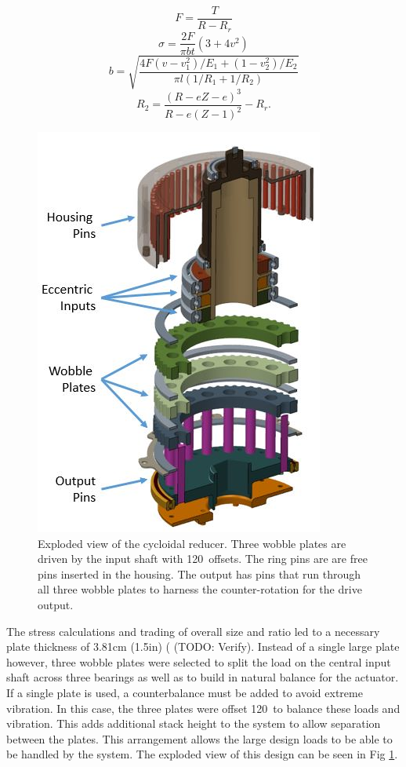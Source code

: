 \begin{equation} \label{eq:5}
F = \frac{T}{R - R_r}
\end{equation}
\begin{equation} \label{eq:6}
\sigma = \frac{2F}{\pi b t} (3 + 4v^2)
\end{equation}
\begin{equation} \label{eq:7}
b = \sqrt{\frac{4F (v-v_1^2) /E_1 + (1 - v_2^2)/E_2}{\pi l (1/R_1 + 1/R_2)}}
\end{equation}
\begin{equation} \label{eq:8}
R_2 = \frac{(R-eZ - e)^3}{R-e(Z-1)^2} - R_r.
\end{equation}

\begin{figure}[!b]
   \centering
   \includegraphics[width=0.75\linewidth]{images/exploded_labeled}
   \caption{Exploded view of the cycloidal reducer.
   Three wobble plates are driven by the input shaft with 120\textdegree\ offsets.
   The ring pins are are free pins inserted in the housing.
   The output has pins that run through all three wobble plates to harness the counter-rotation for the drive output.}
   \label{cycloid_exploded}
\end{figure}

The stress calculations and trading of overall size and ratio led to a necessary plate thickness of 3.81cm (1.5in) ( (TODO: Verify).
Instead of a single large plate however, three wobble plates were selected to split the load on the central input shaft across three bearings as well as to build in natural balance for the actuator.
If a single plate is used, a counterbalance must be added to avoid extreme vibration.
In this case, the three plates were offset 120\textdegree\ to balance these loads and vibration.
This adds additional stack height to the system to allow separation between the plates.
This arrangement allows the large design loads to be able to be handled by the system.
The exploded view of this design can be seen in Fig \ref{cycloid_exploded}.

